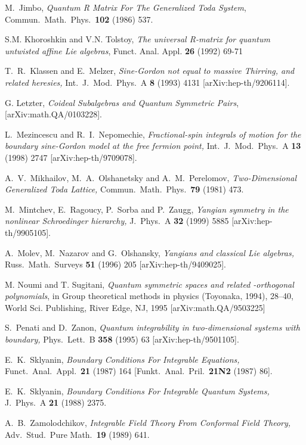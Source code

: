 \documentclass[a4paper,12pt]{article}
\numberwithin{equation}{section}
\begin{document}
{\begin{thebibliography}{99}
M.~Jimbo, \textit{Quantum R Matrix For The Generalized Toda
System}, Commun.\ Math.\ Phys.\  {\bf 102} (1986) 537.

 S.M. Khoroshkin and V.N. Tolstoy, \textit{The
universal R-matrix for quantum untwisted affine Lie algebras},
Funct. Anal. Appl. {\bf 26} (1992) 69-71

T.~R.~Klassen and E.~Melzer, \textit{Sine-Gordon not equal to
massive Thirring, and related heresies,} Int.\ J.\ Mod.\ Phys.\ A
{\bf 8} (1993) 4131 [arXiv:hep-th/9206114].


 G. Letzter, \textit{Coideal Subalgebras and Quantum Symmetric
Pairs}, [arXiv:math.QA/0103228].

L.~Mezincescu and R.~I.~Nepomechie, \textit{Fractional-spin
integrals of motion for the boundary sine-Gordon model  at the
free fermion point,} Int.\ J.\ Mod.\ Phys.\ A {\bf 13} (1998) 2747
[arXiv:hep-th/9709078].


A.~V.~Mikhailov, M.~A.~Olshanetsky and A.~M.~Perelomov,
\textit{Two-Dimensional Generalized Toda Lattice,} Commun.\ Math.\
Phys.\  {\bf 79} (1981) 473.


M.~Mintchev, E.~Ragoucy, P.~Sorba and P.~Zaugg, \textit{Yangian
symmetry in the nonlinear Schroedinger hierarchy,} J.\ Phys.\ A
{\bf 32} (1999) 5885 [arXiv:hep-th/9905105].

A.~Molev, M.~Nazarov and G.~Olshansky, \textit{Yangians and
classical Lie algebras,} Russ.\ Math.\ Surveys {\bf 51} (1996) 205
[arXiv:hep-th/9409025].

M. Noumi and T. Sugitani, \textit{Quantum symmetric
spaces and related \myHighlight{$q$}\coordHE{}-orthogonal polynomials}, in Group
theoretical methods in physics (Toyonaka, 1994), 28--40, World
Sci. Publishing, River Edge, NJ, 1995 [arXiv:math.QA/9503225]

S.~Penati and D.~Zanon, \textit{Quantum integrability in
two-dimensional systems with boundary,} Phys.\ Lett.\ B {\bf 358}
(1995) 63 [arXiv:hep-th/9501105].

E.~K.~Sklyanin, \textit{Boundary Conditions For Integrable
Equations,} Funct.\ Anal.\ Appl.\  {\bf 21} (1987) 164 [Funkt.\
Anal.\ Pril.\ {\bf 21N2} (1987) 86].

E.~K.~Sklyanin, \textit{Boundary Conditions For Integrable Quantum
Systems,} J.\ Phys.\ A {\bf 21} (1988) 2375.

A.~B.~Zamolodchikov, \textit{Integrable Field Theory From
Conformal Field Theory,} Adv.\ Stud.\ Pure Math.\  {\bf 19} (1989)
641.


\end{thebibliography}
}
\end{document}
